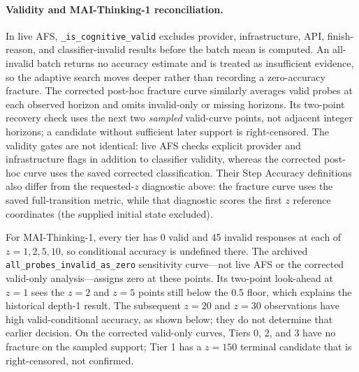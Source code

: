 \documentclass{article}
\begin{document}
\paragraph{Validity and MAI-Thinking-1 reconciliation.}
In live AFS, \texttt{\_is\_cognitive\_valid} excludes provider, infrastructure,
API, finish-reason, and classifier-invalid results before the batch mean is
computed. An all-invalid batch returns no accuracy estimate and is treated as
insufficient evidence, so the adaptive search moves deeper rather than
recording a zero-accuracy fracture. The corrected post-hoc fracture curve
similarly averages valid probes at each observed horizon and omits invalid-only
or missing horizons. Its two-point recovery check uses the next two
\emph{sampled} valid-curve points, not adjacent integer horizons; a candidate
without sufficient later support is right-censored. The validity gates are not
identical: live AFS checks explicit provider and infrastructure flags in
addition to classifier validity, whereas the corrected post-hoc curve uses the
saved corrected classification. Their Step Accuracy definitions also differ
from the requested-$z$ diagnostic above: the fracture curve uses the saved
full-transition metric, while that diagnostic scores the first $z$ reference
coordinates (the supplied initial state excluded).

For MAI-Thinking-1, every tier has 0 valid and 45 invalid responses at each of
$z=1,2,5,10$, so conditional accuracy is undefined there. The archived
\texttt{all\_probes\_invalid\_as\_zero} sensitivity curve—not live AFS or the
corrected valid-only analysis—assigns zero at these points. Its two-point
look-ahead at $z=1$ sees the $z=2$ and $z=5$ points still below the 0.5 floor,
which explains the historical depth-1 result. The subsequent $z=20$ and
$z=30$ observations have high valid-conditional accuracy, as shown below; they
do not determine that earlier decision. On the corrected valid-only curves,
Tiers 0, 2, and 3 have no fracture on the sampled support; Tier 1 has a
$z=150$ terminal candidate that is right-censored, not confirmed.
\end{document}
